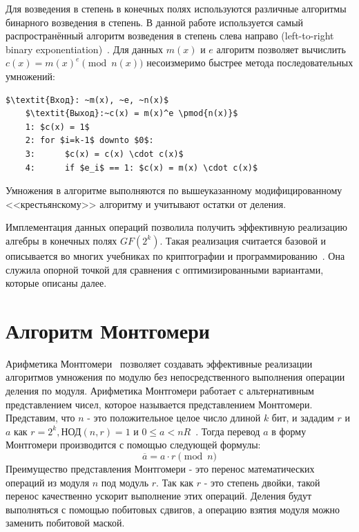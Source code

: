 \documentclass[times,specification,annotation]{itmo-student-thesis}
\begin{document}
Для возведения в степень в конечных полях используются различные алгоритмы бинарного возведения в степень.
В данной работе используется самый распространённый алгоритм возведения в степень слева направо (left-to-right binary exponentiation)~\cite{koc97}.
Для данных $m(x)$ и $e$ алгоритм позволяет вычислить $c(x) = m(x)^e \pmod{n(x)}$ несоизмеримо быстрее метода последовательных умножений:
\begin{lstlisting}[mathescape=true]
    $\textit{Вход}: ~m(x), ~e, ~n(x)$
    $\textit{Выход}:~c(x) = m(x)^e \pmod{n(x)}$
    1: $c(x) = 1$
    2: for $i=k-1$ downto $0$:
    3:      $c(x) = c(x) \cdot c(x)$
    4:      if $e_i$ == 1: $c(x) = m(x) \cdot c(x)$
\end{lstlisting}
Умножения в алгоритме выполняются по вышеуказанному модифицированному <<крестьянскому>> алгоритму и учитывают остатки от деления.

Имплементация данных операций позволила получить эффективную реализацию алгебры в конечных полях $GF(2^k)$.
Такая реализация считается базовой и описывается во многих учебниках по криптографии и программированию~\cite{men01,sma15,knu97_2}.
Она служила опорной точкой для сравнения с оптимизированными вариантами, которые описаны далее.


\section{Алгоритм Монтгомери}\label{sec:mont}

Арифметика Монтгомери~\cite{men01,sma15} позволяет создавать эффективные реализации алгоритмов умножения по модулю без непосредственного выполнения операции деления по модуля.
Арифметика Монтгомери работает с альтернативным представлением чисел, которое называется представлением Монтгомери.
Представим, что $n$ - это положительное целое число длиной $k$ бит, и зададим $r$ и $a$ как
$r = 2^k, \text{НОД}(n,r) = 1$ и $0 \leq a < nR$~\cite{koc98}.
Тогда перевод $a$ в форму Монтгомери производится с помощью следующей формулы:
\[\overline{a} = a \cdot r \pmod{n}\]
Преимущество представления Монтгомери - это перенос математических операций из модуля $n$ под модуль $r$.
Так как $r$ - это степень двойки, такой перенос качественно ускорит выполнение этих операций.
Деления будут выполняться с помощью побитовых сдвигов, а операцию взятия модуля можно заменить побитовой маской.
\end{document}
